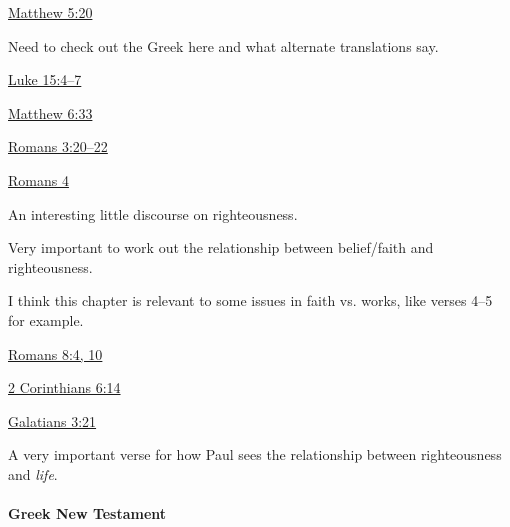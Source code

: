 			\begin{compactdesc}
				\item[{\hyperref[MATTHEW-5-20]{Matthew 5:20}}] \phantom{.}
					\begin{compactitem}
						\item Need to check out the Greek here and what alternate translations say.
					\end{compactitem}
				\item[{\hyperref[LUKE-15-4]{Luke 15:4--7}}]
				\item[{\hyperref[MATTHEW-6-33]{Matthew 6:33}}]
				\item[{\hyperref[ROMANS-3-20]{Romans 3:20--22}}]
				\item[{\hyperref[ROMANS-4]{Romans 4}}] \phantom{.}
					\begin{compactitem}
						\item An interesting little discourse on righteousness.
						\item Very important to work out the relationship between belief/faith and righteousness.
						\item I think this chapter is relevant to some issues in faith vs. works, like verses 4--5 for example.
					\end{compactitem}
				\item[{\hyperref[ROMANS-8-4]{Romans 8:4, 10}}] 
				\item[{\hyperref[2CORINTHIANS-6-14]{2 Corinthians 6:14}}] 
				\item[{\hyperref[GALATIANS-3-21]{Galatians 3:21}}] \phantom{.}
					\begin{compactitem}
						\item A very important verse for how Paul sees the relationship between righteousness and \textit{life}.
					\end{compactitem}
			\end{compactdesc}
			
		\paragraph{Greek New Testament} %
			\label{RIGHTEOUSNESS-GREEK}
			
			\subparagraph{\texorpdfstring{}{}}
				\label{ADIKIA}
			
